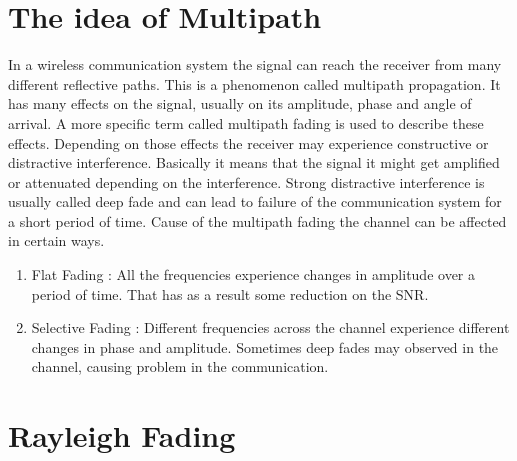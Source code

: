 \section{The idea of Multipath}

In a wireless communication system the signal can reach the receiver from many different reflective paths. This is a phenomenon called multipath propagation. It has many effects on the signal, usually on its amplitude, phase and angle of arrival.\citep{Fading} A more specific term called multipath fading is used to describe these effects. Depending on those effects the receiver may experience constructive or distractive interference. Basically it means that the signal it might get amplified or attenuated depending on the interference. Strong distractive interference is usually called deep fade and can lead to failure of the communication system for a short period of time. Cause of the multipath fading the channel can be affected in certain ways.
	\begin{enumerate}
	\item Flat Fading : All the frequencies experience changes in amplitude over a period of time. That has as a result some reduction on the SNR.
	\item Selective Fading : Different frequencies across the channel experience different changes in phase and amplitude. Sometimes deep fades may observed in the channel, causing problem in the communication.\citep{FlatSelective}
	\end{enumerate}



	
\section{Rayleigh Fading}

